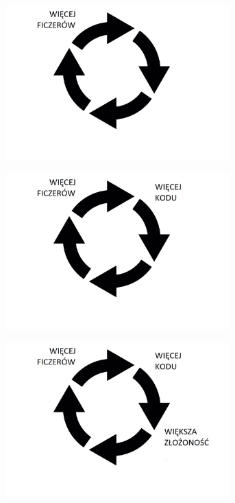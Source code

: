 \documentclass{beamer}
\begin{document}
\begin{frame}{}
\begin{center}
  	\includegraphics[height=6cm]{pgf2.jpg}
\end{center}
\end{frame}

\begin{frame}{}
\begin{center}
  	\includegraphics[height=6cm]{pgf3.jpg}
\end{center}
\end{frame}

\begin{frame}{}
\begin{center}
  	\includegraphics[height=6cm]{pgf4.jpg}
\end{center}
\end{frame}
\end{document}
